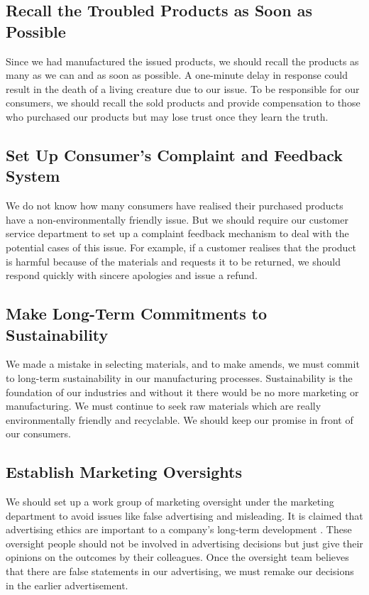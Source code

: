 \documentclass[12pt]{article}
\begin{document}
\subsection{Recall the Troubled Products as Soon as Possible}

Since we had manufactured the issued products, we should recall the products as many as we can and as soon as possible. A one-minute delay in response could result in the death of a living creature due to our issue. To be responsible for our consumers, we should recall the sold products and provide compensation to those who purchased our products but may lose trust once they learn the truth.

\subsection{Set Up Consumer's Complaint and Feedback System}

We do not know how many consumers have realised their purchased products have a non-environmentally friendly issue. But we should require our customer service department to set up a complaint feedback mechanism to deal with the potential cases of this issue. For example, if a customer realises that the product is harmful because of the materials and requests it to be returned, we should respond quickly with sincere apologies and issue a refund.

\subsection{Make Long-Term Commitments to Sustainability}

We made a mistake in selecting materials, and to make amends, we must commit to long-term sustainability in our manufacturing processes. Sustainability is the foundation of our industries and without it there would be no more marketing or manufacturing. We must continue to seek raw materials which are really environmentally friendly and recyclable. We should keep our promise in front of our consumers.

\subsection{Establish Marketing Oversights}

We should set up a work group of marketing oversight under the marketing department to avoid issues like false advertising and misleading. It is claimed that advertising ethics are important to a company's long-term development \citep{schauster2018ethics}. These oversight people should not be involved in advertising decisions but just give their opinions on the outcomes by their colleagues. Once the oversight team believes that there are false statements in our advertising, we must remake our decisions in the earlier advertisement.
\end{document}
